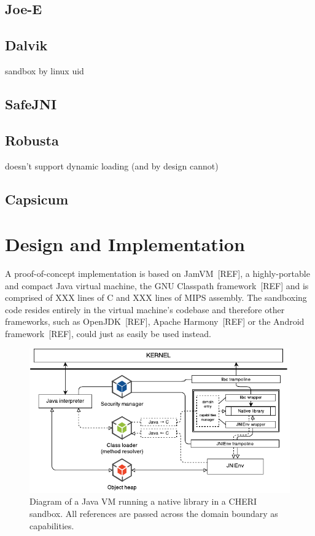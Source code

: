 \documentclass[a4paper,12pt,twoside,openright]{report}
\begin{document}
\section{Joe-E}

\section{Dalvik}

sandbox by linux uid

\section{SafeJNI}

\section{Robusta}

doesn't support dynamic loading (and by design cannot)

\section{Capsicum}

\chapter{Design and Implementation} 

A proof-of-concept implementation is based on JamVM~[REF], a highly-portable and compact Java virtual machine, the GNU Classpath framework~[REF] and is comprised of XXX lines of C and XXX lines of MIPS assembly. The sandboxing code resides entirely in the virtual machine's codebase and therefore other frameworks, such as OpenJDK~[REF], Apache Harmony~[REF] or the Android framework~[REF], could just as easily be used instead.

\begin{figure}
	\includegraphics[width=\textwidth]{dia_jni_caps.pdf}
	\caption{Diagram of a Java VM running a native library in a CHERI sandbox. All references are passed across the domain boundary as capabilities.}
	\label{fig:OverviewCheriJNI}
\end{figure}
\end{document}
